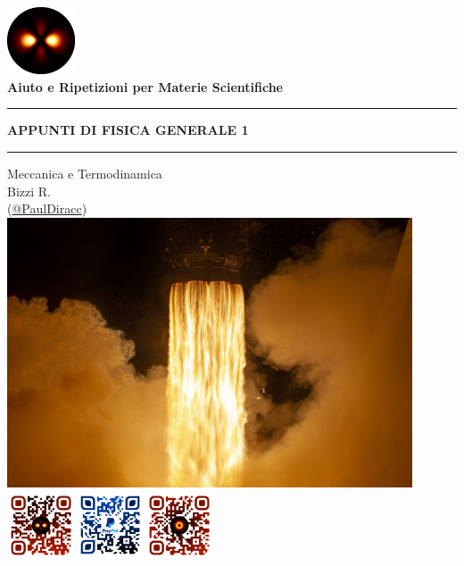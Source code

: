 \begin{titlepage}
\begin{center}
\href{\Grouplink}{\includegraphics[width=0.15\textwidth]{../logo.png}}\\
\huge{\textbf{Aiuto e Ripetizioni per Materie Scientifiche}}\\
\vspace{25mm}
\hrule
\vspace{2.5mm}
\Huge{\textbf{APPUNTI DI FISICA GENERALE 1}}
\vspace{2.5mm}
\hrule
\vspace{3.5mm}
\Large{Meccanica e Termodinamica}
\\[2.5mm]
\normalsize{
    Bizzi R.\\
    \textcolor[RGB]{\hashcolor}{(\href{\Riccardolink}{\textcolor[RGB]{\hashcolor}{@PaulDiracc}})}
}
\\[5mm]
\href{https://www.esa.int/ESA_Multimedia/Images/2021/04/Dragon_fire}{
    \includegraphics[width=0.9\textwidth]{images/cop.jpg}}
\\[15mm]
\href{\Grouplink}{\includegraphics[width=0.15\textwidth]{../QR_group.png}}\qquad
\href{\PayPallink}{\includegraphics[width=0.14\textwidth]{../QR_PayPal.png}}\qquad
\href{\Riccardolink}{\includegraphics[width=0.15\textwidth]{../QR_me.png}}
\end{center}
\end{titlepage}
